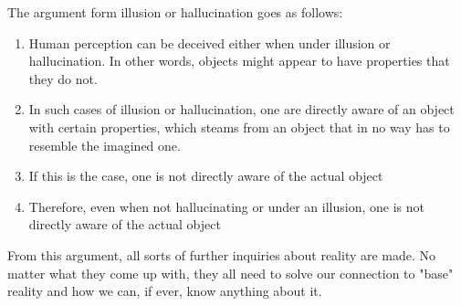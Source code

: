 \documentclass[fleqn,14pt]{article}
\begin{document}

The argument form illusion or hallucination goes as follows\cite[p.295]{sosa}:

\begin{enumerate}
  \item Human perception can be deceived either when under illusion or
  hallucination. In other words, objects might appear to have properties that
  they do not.
  \item In such cases of illusion or hallucination, one are directly aware of an
  object with certain properties, which steams from an object that in no way
  has to resemble the imagined one.
  \item If this is the case, one is not directly aware of the actual object 
  \item Therefore, even when not hallucinating or under an illusion, one is not directly aware
  of the actual object
\end{enumerate}
From this argument, all sorts of further inquiries about reality are made. No matter what they
come up with,
they all need to solve our connection to "base" reality and how we can, if ever, know anything about it.\\
\end{document}
